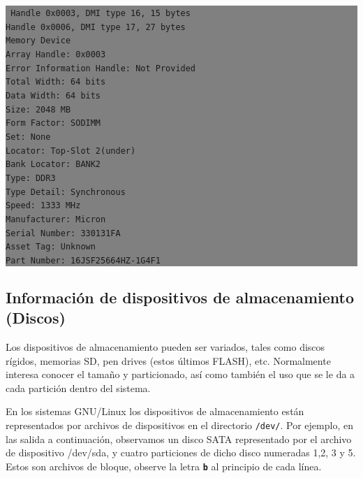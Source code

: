 \documentclass[12pt]{article}
\begin{document}
\colorbox{grey}{\parbox[t]{0.95\linewidth}{ \vspace*{0.5cm} { 
{\tt
Handle 0x0003, DMI type 16, 15 bytes\\
Handle 0x0006, DMI type 17, 27 bytes\\
Memory Device\\
	Array Handle: 0x0003\\
	Error Information Handle: Not Provided\\
	Total Width: 64 bits\\
	Data Width: 64 bits\\
	Size: 2048 MB\\
	Form Factor: SODIMM\\
	Set: None\\
	Locator: Top-Slot 2(under)\\
	Bank Locator: BANK2\\
	Type: DDR3\\
	Type Detail: Synchronous\\
	Speed: 1333 MHz\\
	Manufacturer: Micron\\
	Serial Number: 330131FA\\
	Asset Tag: Unknown\\
	Part Number: 16JSF25664HZ-1G4F1\\
}
} \vspace*{0.5cm} } } 

\subsection*{Información de dispositivos de almacenamiento (Discos)}

Los dispositivos de almacenamiento pueden ser variados, tales como discos rígidos,
memorias SD, pen drives (estos últimos FLASH), etc.
Normalmente interesa conocer el tamaño y particionado, así como también el uso 
que se le da a cada partición dentro del sistema.  

En los sistemas GNU/Linux los dispositivos de almacenamiento están representados por 
archivos de dispositivos en el directorio \texttt{/dev/}. Por ejemplo, en las salida a continuación,
observamos un disco SATA representado por el archivo de dispositivo /dev/sda, y cuatro 
particiones de dicho disco numeradas 1,2, 3 y 5. Estos son archivos de bloque, observe la letra 
\textbf{\texttt{b}} al principio de cada línea. 
\end{document}

